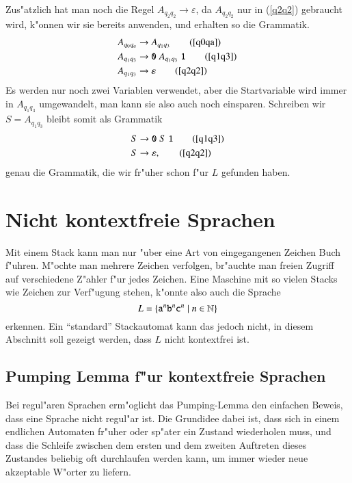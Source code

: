 \begin{beispiel}
Zus"atzlich hat man noch die Regel $A_{q_2q_2}\to\varepsilon$, da 
$A_{q_2q_2}$ nur in (\ref{q2q2}) gebraucht wird, k"onnen wir sie
bereits anwenden, und erhalten so die Grammatik.
\begin{align}
A_{q_0q_a}&\to A_{q_1q_3} \tag{\ref{q0qa}}\\
A_{q_1q_3}&\to \texttt{0}\; A_{q_1q_3}\;\texttt{1} \tag{\ref{q1q3}}\\
A_{q_1q_3}&\to \varepsilon\tag{\ref{q2q2}}
\end{align}
Es werden nur noch zwei Variablen verwendet, aber die Startvariable
wird immer in $A_{q_1q_3}$ umgewandelt, man kann sie also auch noch
einsparen. Schreiben wir $S=A_{q_1q_3}$ bleibt somit als
Grammatik
\begin{align}
S&\to \texttt{0}\; S\; \texttt{1}\tag{\ref{q1q3}}\\
S&\to\varepsilon,\tag{\ref{q2q2}}
\end{align}
genau die Grammatik, die wir fr"uher schon f"ur $L$ gefunden haben.
\end{beispiel}

\section{Nicht kontextfreie Sprachen}
Mit einem Stack kann man nur "uber eine Art von eingegangenen
Zeichen Buch f"uhren. M"ochte man mehrere Zeichen verfolgen,
br"auchte man freien Zugriff auf verschiedene Z"ahler f"ur jedes
Zeichen. Eine Maschine mit so vielen Stacks wie Zeichen zur Verf"ugung
stehen, k"onnte also auch die Sprache
\[
L=\{ {\tt a}^n {\tt b}^n {\tt c}^n\;|\;n\in\mathbb N\}
\]
erkennen. Ein ``standard'' Stackautomat kann das jedoch nicht,
in diesem Abschnitt soll gezeigt werden, dass $L$ nicht kontextfrei
ist. 

\subsection{Pumping Lemma f"ur kontextfreie Sprachen}
Bei regul"aren Sprachen erm"oglicht das Pumping-Lemma den einfachen
Beweis, dass eine Sprache nicht regul"ar ist. Die Grundidee dabei ist,
dass sich in einem endlichen Automaten fr"uher oder sp"ater ein
Zustand wiederholen muss, und dass die Schleife zwischen dem ersten
und dem zweiten Auftreten dieses Zustandes beliebig oft durchlaufen
werden kann, um immer wieder neue akzeptable W"orter zu liefern.

